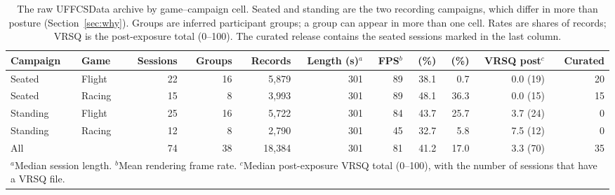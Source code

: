 \begin{table}[t]
\centering
\footnotesize
\caption{The raw UFFCSData archive by game--campaign cell. Seated and standing are the two recording campaigns, which differ in more than posture (Section~\ref{sec:why}). Groups are inferred participant groups; a group can appear in more than one cell. Rates are shares of records; VRSQ is the post-exposure total (0--100). The curated release contains the seated sessions marked in the last column.}
\label{tab:archive}
\begin{tabular}{llrrrrrrrrr}
\toprule
Campaign & Game & Sessions & Groups & Records & Length (s)$^{a}$ & FPS$^{b}$ & \sevone{} (\%) & \sevtwo{} (\%) & VRSQ post$^{c}$ & Curated \\
\midrule
Seated & Flight & 22 & 16 & 5,879 & 301 & 89 & 38.1 & 0.7 & 0.0 (19) & 20 \\
Seated & Racing & 15 & 8 & 3,993 & 301 & 89 & 48.1 & 36.3 & 0.0 (15) & 15 \\
Standing & Flight & 25 & 16 & 5,722 & 301 & 84 & 43.7 & 25.7 & 3.7 (24) & 0 \\
Standing & Racing & 12 & 8 & 2,790 & 301 & 45 & 32.7 & 5.8 & 7.5 (12) & 0 \\
\midrule
All & & 74 & 38 & 18,384 & 301 & 81 & 41.2 & 17.0 & 3.3 (70) & 35 \\
\bottomrule
\multicolumn{11}{l}{$^{a}$Median session length. $^{b}$Mean rendering frame rate. $^{c}$Median post-exposure VRSQ total (0--100), with the number of sessions that have a VRSQ file.}
\end{tabular}
\end{table}